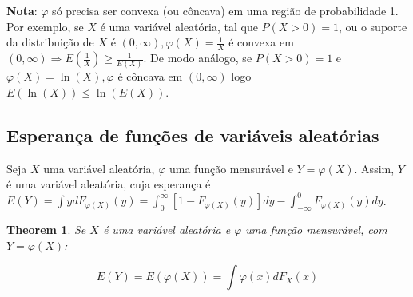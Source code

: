 \documentclass[
]{article}
\newtheorem{theorem}{Theorem}[section]
\theoremstyle{definition}
\theoremstyle{definition}
\theoremstyle{definition}
\theoremstyle{definition}
\theoremstyle{remark}
\begin{document}
\textbf{Nota}: \(\varphi\) só precisa ser convexa (ou côncava) em uma região de probabilidade 1. Por exemplo, se \(X\) é uma variável aleatória, tal que \(P(X > 0) = 1\), ou o suporte da distribuição de \(X\) é \((0, \infty), \varphi(X) = \frac{1}{X}\) é convexa em \((0,\infty) \Rightarrow E\left(\frac{1}{X}\right) \ge \frac{1}{E(X)}\). De modo análogo, se \(P(X > 0) = 1\) e \(\varphi(X) = \ln(X), \varphi\) é côncava em \((0,\infty)\) logo \(E(\ln(X)) \le \ln(E(X))\).

\hypertarget{esperanuxe7a-de-funuxe7uxf5es-de-variuxe1veis-aleatuxf3rias}{%
\subsection{Esperança de funções de variáveis aleatórias}\label{esperanuxe7a-de-funuxe7uxf5es-de-variuxe1veis-aleatuxf3rias}}

Seja \(X\) uma variável aleatória, \(\varphi\) uma função mensurável e \(Y = \varphi(X)\). Assim, \(Y\) é uma variável aleatória, cuja esperança é \(E(Y) = \int ydF_{\varphi(X)}(y) = \int_{0}^{\infty}[1 - F_{\varphi(X)}(y)]dy - \int_{-\infty}^{0}F_{\varphi(X)}(y)dy\).

\begin{theorem}
\protect\hypertarget{thm:espfunc}{}\label{thm:espfunc}Se \(X\) é uma variável aleatória e \(\varphi\) uma função mensurável, com \(Y = \varphi(X)\):

\begin{equation*}
E(Y) = E(\varphi(X)) = \int\varphi(x)dF_{X}(x)
\end{equation*}
\end{theorem}
\end{document}
